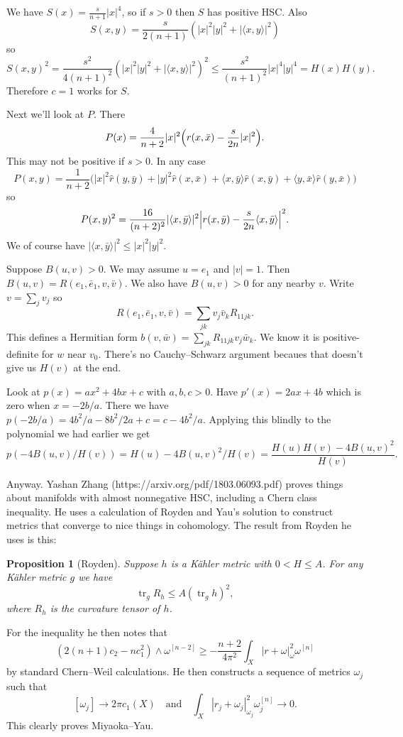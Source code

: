 \documentclass[11pt]{amsart}
\newtheorem{prop}[theo]{Proposition}
\theoremstyle{definition}
\def\^#1{^{[#1]}}
\def\qandq{\quad\text{and}\quad}
\DeclareMathOperator{\tr}{tr}
\def\<{\langle}
\def\>{\rangle}
\begin{document}
We have $S(x) = \frac{s}{n+1} |x|^4$, so if $s > 0$ then $S$ has positive HSC.
Also
$$
S(x,y)
= \frac{s}{2(n+1)} (|x|^2 |y|^2 + |\<x, y\>|^2)
$$
so
$$
S(x,y)^2
= \frac{s^2}{4(n+1)^2}(|x|^2 |y|^2 + |\<x, y\>|^2)^2
\leq \frac{s^2}{(n+1)^2}|x|^4 |y|^4
= H(x) H(y).
$$
Therefore $c = 1$ works for $S$.

Next we'll look at $P$.
There
$$
P(x) =
\frac{4}{n+2}
|x|^2 \Bigl(r(x, \bar x) - \frac{s}{2n} |x|^2\Bigr).
$$
This may not be positive if $s > 0$. In any case
$$
P(x,y) =
\frac{1}{n+2}\bigl(
|x|^2 \hat r(y, \bar y)
+ |y|^2 \hat r(x, \bar x)
+ \<x, \bar y\> \hat r(x, \bar y)
+ \<y, \bar x\> \hat r(y, \bar x)
\bigr)
$$
so
$$
P(x,y)^2 =
\frac{16}{(n+2)^2} |\<x, \bar y\>|^2
\Bigl| r(x, \bar y) - \frac{s}{2n} \<x, \bar y\> \Bigr|^2.
$$
We of course have $|\<x, \bar y\>|^2 \leq |x|^2 |y|^2$.

Suppose $B(u,v) > 0$.
We may assume $u = e_1$ and $|v| = 1$.
Then
$
B(u,v) = R(e_1, \bar e_1, v, \bar v)
$.
We also have $B(u,v) > 0$ for any nearby $v$.
Write $v = \sum_j v_j$ so
$$
R(e_1, \bar e_1, v, \bar v)
= \sum_{jk} v_j \bar v_k R_{11jk}.
$$
This defines a Hermitian form $b(v,\bar w) = \sum_{jk} R_{11jk} v_j \bar w_k$.
We know it is positive-definite for $w$ near $v_0$.
There's no Cauchy--Schwarz argument becaues that doesn't give us $H(v)$ at the end.

Look at $p(x) = ax^2 + 4bx + c$ with $a,b,c > 0$.
Have $p'(x) = 2ax + 4b$ which is zero when $x = - 2b / a$.
There we have
$p(-2b/a) = 4b^2/a - 8b^2 / 2a + c = c - 4b^2 / a$.
Applying this blindly to the polynomial we had earlier we get
$$
p(-4B(u,v)/H(v))
= H(u) - 4 B(u,v)^2 / H(v)
= \frac{H(u)H(v) - 4B(u,v)^2}{H(v)}.
$$


Anyway.
Yashan Zhang (https://arxiv.org/pdf/1803.06093.pdf) proves things
about manifolds with almost nonnegative HSC, including a Chern class inequality.
He uses a calculation of Royden and Yau's solution to construct metrics that
converge to nice things in cohomology.
The result from Royden he uses is this:

\begin{prop}[Royden]
Suppose $h$ is a K\"ahler metric with $0 < H \leq A$.
For any K\"ahler metric $g$ we have
$$
\tr_g R_h \leq A (\tr_g h)^2,
$$
where $R_h$ is the curvature tensor of $h$.
\end{prop}

For the inequality he then notes that
$$
(2(n+1)c_2 - n c_1^2) \wedge \omega\^{n-2}
\geq - \frac{n+2}{4\pi^2} \int_X | r + \omega |^2_\omega \omega\^n
$$
by standard Chern--Weil calculations.
He then constructs a sequence of metrics $\omega_j$ such that
$$
[\omega_{j}] \to 2 \pi c_1(X)
\qandq
\int_X |r_j + \omega_j|^2_{\omega_j} \omega_j\^n \to 0.
$$
This clearly proves Miyaoka--Yau.
\end{document}
